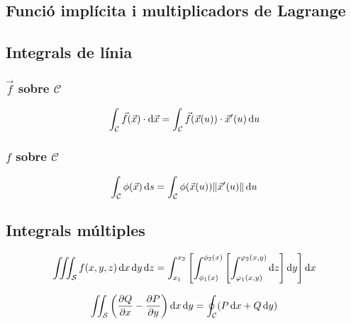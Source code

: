 \newpage
\subsection*{Funció implícita i multiplicadors de Lagrange}

\subsection*{Integrals de línia}
\subsubsection*{$\vec{f}$ sobre $\mathcal{C}$}
\begin{align}
    \int_{\mathcal{C}} \vec{f}(\vec{x}) \cdot \mathrm{d} \vec{x} = \int_{\mathcal{C}} \vec{f}(\vec{x}(u)) \cdot \vec{x}'(u) \mathop{}\!\mathrm{d} u
\end{align}

\subsubsection*{$f$ sobre $\mathcal{C}$}
\begin{align}
    \int_{\mathcal{C}} \phi (\vec{x}) \mathop{}\!\mathrm{d} s = \int_{\mathcal{C}} \phi (\vec{x}(u)) \| \vec{x}'(u) \| \mathop{}\!\mathrm{d} u
\end{align}

\subsection*{Integrals múltiples}
\begin{align}
    \iiint_{\mathcal{S}} f(x,y,z) \mathop{}\!\mathrm{d} x \mathop{}\!\mathrm{d} y \mathop{}\!\mathrm{d} z = \int_{x_{1}}^{x_{2}} \left[ \int_{\phi_{1}(x)}^{\phi_{2}(x)} \left[ \int_{\varphi_{1}(x,y)}^{\varphi_{2}(x,y)} \mathop{}\!\mathrm{d} z \right] \mathop{}\!\mathrm{d} y \right] \mathop{}\!\mathrm{d} x
\end{align}

\begin{thm}[Green]
\begin{align}
    \iint_{\mathcal{S}} \left( \frac{\partial Q}{\partial x} - \frac{\partial P}{\partial y} \right)  \mathop{}\!\mathrm{d} x \mathop{}\!\mathrm{d} y = \oint_{\mathcal{C}} (P\mathop{}\!\mathrm{d} x + Q \mathop{}\!\mathrm{d} y)
\end{align}
\end{thm}

